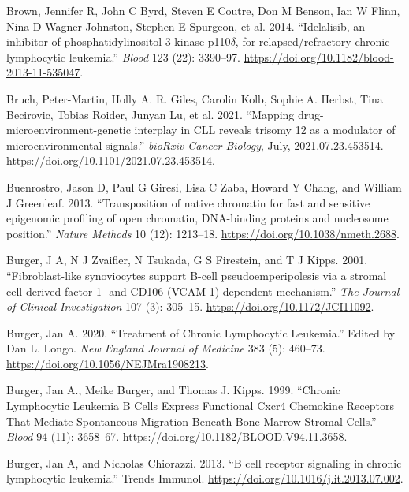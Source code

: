 \documentclass[11pt, a4paper, twosided]{book}
\newenvironment{CSLReferences}%
  {}%
  {\par}
\begin{document}
\begin{CSLReferences}{1}{0}
\leavevmode{}%
Brown, Jennifer R, John C Byrd, Steven E Coutre, Don M Benson, Ian W Flinn, Nina D Wagner-Johnston, Stephen E Spurgeon, et al. 2014. {``{Idelalisib, an inhibitor of phosphatidylinositol 3-kinase p110\(\delta\), for relapsed/refractory chronic lymphocytic leukemia}.''} \emph{Blood} 123 (22): 3390--97. \url{https://doi.org/10.1182/blood-2013-11-535047}.

\leavevmode{}%
Bruch, Peter-Martin, Holly A. R. Giles, Carolin Kolb, Sophie A. Herbst, Tina Becirovic, Tobias Roider, Junyan Lu, et al. 2021. {``{Mapping drug-microenvironment-genetic interplay in CLL reveals trisomy 12 as a modulator of microenvironmental signals}.''} \emph{bioRxiv Cancer Biology}, July, 2021.07.23.453514. \url{https://doi.org/10.1101/2021.07.23.453514}.

\leavevmode{}%
Buenrostro, Jason D, Paul G Giresi, Lisa C Zaba, Howard Y Chang, and William J Greenleaf. 2013. {``{Transposition of native chromatin for fast and sensitive epigenomic profiling of open chromatin, DNA-binding proteins and nucleosome position}.''} \emph{Nature Methods} 10 (12): 1213--18. \url{https://doi.org/10.1038/nmeth.2688}.

\leavevmode{}%
Burger, J A, N J Zvaifler, N Tsukada, G S Firestein, and T J Kipps. 2001. {``{Fibroblast-like synoviocytes support B-cell pseudoemperipolesis via a stromal cell-derived factor-1- and CD106 (VCAM-1)-dependent mechanism.}''} \emph{The Journal of Clinical Investigation} 107 (3): 305--15. \url{https://doi.org/10.1172/JCI11092}.

\leavevmode{}%
Burger, Jan A. 2020. {``{Treatment of Chronic Lymphocytic Leukemia}.''} Edited by Dan L. Longo. \emph{New England Journal of Medicine} 383 (5): 460--73. \url{https://doi.org/10.1056/NEJMra1908213}.

\leavevmode{}%
Burger, Jan A., Meike Burger, and Thomas J. Kipps. 1999. {``{Chronic Lymphocytic Leukemia B Cells Express Functional Cxcr4 Chemokine Receptors That Mediate Spontaneous Migration Beneath Bone Marrow Stromal Cells}.''} \emph{Blood} 94 (11): 3658--67. \url{https://doi.org/10.1182/BLOOD.V94.11.3658}.

\leavevmode{}%
Burger, Jan A, and Nicholas Chiorazzi. 2013. {``{B cell receptor signaling in chronic lymphocytic leukemia}.''} Trends Immunol. \url{https://doi.org/10.1016/j.it.2013.07.002}.


\end{CSLReferences}
\end{document}
